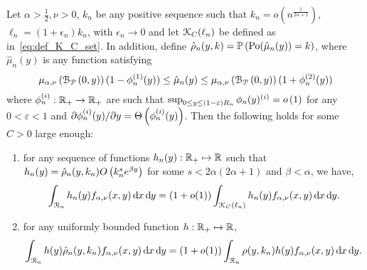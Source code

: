 \begin{lemma}\label{lem:concentration_argument_rho_approximation}
Let $\alpha > \frac{1}{2}, \nu > 0$, $k_n$ be any positive sequence such that $k_n = o(n^{\frac{1}{2\alpha + 1}})$, $\ell_n = (1 + \epsilon_n)k_n$, with $\epsilon_n \to 0$ and let ${\mathcal K}_{C}(\ell_n)$ be defined as in~\eqref{eq:def_K_C_set}. In addition, define $\hat{\rho}_n(y,k) = \mathbb{P}\left({\mathrm{Po}}(\hat{\mu}_n(y)) = k\right)$, where $\hat{\mu}_n(y)$ is any function satisfying 
\[
	\mu_{\alpha,\nu}\left({\mathcal B}_{{\mathcal P}}\left(0,y\right)\right)(1 - \phi_n^{(1)}(y)) \le \hat{\mu}_n(y) \le \mu_{\alpha,\nu}\left({\mathcal B}_{{\mathcal P}}\left(0,y\right)\right)(1 + \phi_n^{(2)}(y))
\]
where $\phi_n^{(i)} : {\mathbb R}_+ \to {\ensuremath{\mathbb R}}_+$ are such that $\sup_{0 \le y \le (1-\varepsilon)R_n} \phi_n(y)^{(i)} = o\left(1\right)$ for any $0 < \varepsilon < 1$ and $\partial \phi_n^{(i)}(y)/\partial y = \Theta\left(\phi_n^{(i)}(y)\right)$. Then the following holds for some $C > 0$ large enough:
\begin{enumerate}
\item for any sequence of functions $h_n(y) : {\mathbb R}_+ \mapsto {\ensuremath{\mathbb R}}$ such that $h_n(y) = \hat{\rho}_n(y,k_n) O\left(k_n^s e^{\beta y}\right)$ for some $s < 2\alpha(2\alpha + 1)$ and $\beta < \alpha$, we have,
\[
	\int_{{\mathcal R}_n} h_n(y) f_{\alpha,\nu}(x,y) \operatorname{\mathrm{d}\hspace{-2pt}} x \operatorname{\mathrm{d}\hspace{-2pt}} y 
	= (1 + o(1)) \int_{{\mathcal K}_{C}(\ell_n)} h_n(y) f_{\alpha,\nu}(x,y) \operatorname{\mathrm{d}\hspace{-2pt}} x \operatorname{\mathrm{d}\hspace{-2pt}} y.
\]
\item for any uniformly bounded function $h : {\mathbb R}_+ \mapsto {\ensuremath{\mathbb R}}$,
\[
	\int_{{\mathcal R}_n} h(y) \hat{\rho}_n(y,k_n) f_{\alpha,\nu}(x,y) \operatorname{\mathrm{d}\hspace{-2pt}} x \operatorname{\mathrm{d}\hspace{-2pt}} y 
	= (1 + o(1)) \int_{{\mathcal R}_n} \rho(y,k_n) h(y) f_{\alpha,\nu}(x,y) \operatorname{\mathrm{d}\hspace{-2pt}} x \operatorname{\mathrm{d}\hspace{-2pt}} y.
\]
\end{enumerate}
\end{lemma}

